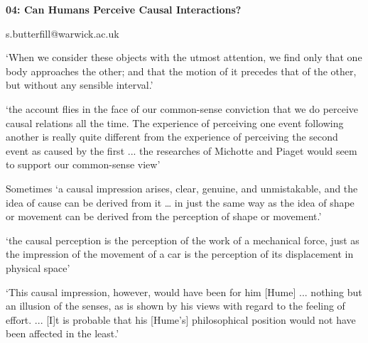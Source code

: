 \documentclass[12pt]{extarticle}
\date{}
\makeatletter
\def \ititle {Philosophical Psychology}
\def \iemail{s.butterfill@warwick.ac.uk}
\makeatother
\begin{document}
\begin{multicols*}{3}

\setlength\footnotesep{1em}











\def \ititle {04: Can Humans Perceive Causal Interactions?}

\begin{center}

{\Large

\textbf{\ititle}

}



\iemail %

\end{center}

‘When we consider these objects with the utmost attention, we find only
that one body approaches the other; and that the motion of it precedes
that of the other, but without any sensible interval.’ \citep[p.~77]{Hume:1739lj}

‘the account flies in the face of our common-sense conviction that we do
perceive causal relations all the time. The experience of perceiving one
event following another is really quite different from the experience of
perceiving the second event as caused by the first ... the researches of Michotte and Piaget would seem to support our
common-sense view’
\citep[pp.~114-5]{Searle:1983tx}

Sometimes ‘a causal impression arises, clear,
genuine, and unmistakable, and the idea of cause can be derived from it
… in just the same way as the idea of shape or movement can be derived
from the perception of shape or movement.’
\citep[p.~270--1]{Michotte:1946nz}

‘the causal perception is the perception of the work of a mechanical force,
just as the impression of the movement of a car is the perception of its
displacement in physical space’
\citep[p.~228]{Michotte:1946nz}

‘This causal impression, however, would have been for him [Hume] ...
nothing but an illusion of the senses, as is shown by his
views with regard to the feeling of effort. ... [I]t is probable that his
[Hume’s] philosophical position would not have been affected in the
least.’
\citep[p.~256]{Michotte:1946nz}


\end{multicols*}
\end{document}
